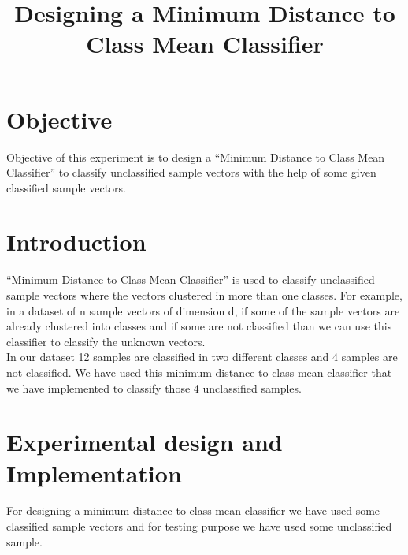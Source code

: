 \title{Designing a Minimum Distance to Class Mean Classifier\\}

\author{
}

\maketitle


\section{Objective}
Objective of this experiment is to design a “Minimum Distance to Class Mean Classifier” to classify unclassified sample vectors with the help of some given classified sample vectors.

\section{Introduction}
“Minimum Distance to Class Mean Classifier” is used to classify unclassified sample vectors where the vectors clustered in more than one classes. For example, in a dataset of n sample vectors of dimension d, if some of the sample vectors are already clustered into classes and if some are not classified than we can use this classifier to classify the unknown vectors.\\
In our dataset 12 samples are classified in two different classes and 4 samples are not classified. We have used this minimum distance to class mean classifier that we have implemented to classify those 4 unclassified samples.

\section{Experimental design and Implementation }
For designing a minimum distance to class mean classifier we have used some classified sample vectors and for testing purpose we have used some unclassified sample. 
